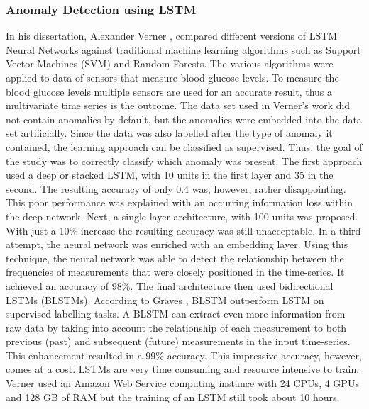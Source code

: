 \subsubsection{Anomaly Detection using LSTM} \label{Anomaly Detection using LSTM}
In his dissertation, Alexander Verner \parencite*{Verner2019}, compared different versions of LSTM Neural Networks against traditional machine learning algorithms such as Support Vector Machines (SVM) and Random Forests. The various algorithms were applied to data of sensors that measure blood glucose levels. To measure the blood glucose levels multiple sensors are used for an accurate result, thus a multivariate time series is the outcome. The data set used in Verner's work did not contain anomalies by default, but the anomalies were embedded into the data set artificially. Since the data was also labelled after the type of anomaly it contained, the learning approach can be classified as supervised. Thus, the goal of the study was to correctly classify which anomaly was present. The first approach used a deep or stacked LSTM, with 10 units in the first layer and 35 in the second. The resulting accuracy of only 0.4 was, however, rather disappointing. This poor performance was explained with an occurring information loss within the deep network. Next, a single layer architecture, with 100 units was proposed. With just a 10\% increase the resulting accuracy was still unacceptable. In a third attempt, the neural network was enriched with an embedding layer. Using this technique, the neural network was able to detect the relationship between the frequencies of measurements that were closely positioned in the time-series. It achieved an accuracy of 98\%. The final architecture then used bidirectional LSTMs (BLSTMs). According to Graves \parencite*{Graves2005}, BLSTM outperform LSTM on supervised labelling tasks. A BLSTM can extract even more information from raw data by taking into account the relationship of each measurement to both previous (past) and subsequent (future) measurements in the input time-series. This enhancement resulted in a 99\% accuracy. This impressive accuracy, however, comes at a cost. LSTMs are very time consuming and resource intensive to train. Verner used an Amazon Web Service computing instance with 24 CPUs, 4 GPUs and 128 GB of RAM but the training of an LSTM still took about 10 hours.  

